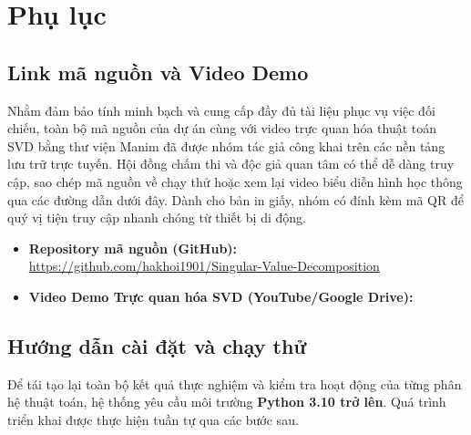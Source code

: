 \appendix
\section{Phụ lục}

\subsection{Link mã nguồn và Video Demo}

Nhằm đảm bảo tính minh bạch và cung cấp đầy đủ tài liệu phục vụ việc đối chiếu, toàn bộ mã nguồn của dự án cùng với video trực quan hóa thuật toán SVD bằng thư viện Manim đã được nhóm tác giả công khai trên các nền tảng lưu trữ trực tuyến. Hội đồng chấm thi và độc giả quan tâm có thể dễ dàng truy cập, sao chép mã nguồn về chạy thử hoặc xem lại video biểu diễn hình học thông qua các đường dẫn dưới đây. Dành cho bản in giấy, nhóm có đính kèm mã QR để quý vị tiện truy cập nhanh chóng từ thiết bị di động.

\begin{itemize}
    \item \textbf{Repository mã nguồn (GitHub):} \\
    \url{https://github.com/hakhoi1901/Singular-Value-Decomposition}
    \item \textbf{Video Demo Trực quan hóa SVD (YouTube/Google Drive):} \\
\end{itemize}

\newpage

\subsection{Hướng dẫn cài đặt và chạy thử}

Để tái tạo lại toàn bộ kết quả thực nghiệm và kiểm tra hoạt động của từng phân hệ thuật toán, hệ thống yêu cầu môi trường \textbf{Python 3.10 trở lên}. Quá trình triển khai được thực hiện tuần tự qua các bước sau.

